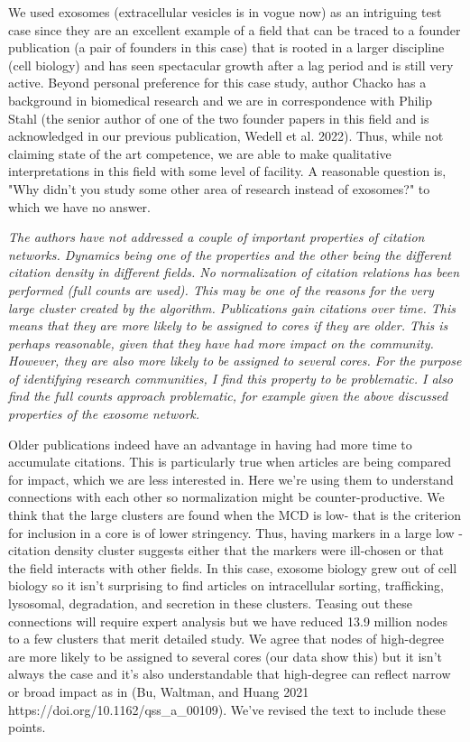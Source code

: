 \documentclass[11pt, oneside]{article}   	%
\begin{document}
We used exosomes (extracellular vesicles is in vogue now) as an intriguing  test case since they are an excellent example of a field that can be traced to a founder publication (a pair of founders in this case) that is rooted in a larger discipline (cell biology) and has seen spectacular growth after a lag period and is still very active. Beyond personal preference for this case study, author Chacko has a background in biomedical research and we are in correspondence with Philip Stahl (the senior author of one of the two founder papers in this field and is acknowledged in our previous publication, Wedell et al. 2022). Thus, while not claiming state of the art competence, we are able to make qualitative interpretations in this field with some level of facility.  A reasonable question is, "Why didn't you study some other area of research instead of exosomes?" to which we have no answer. 

\emph{The authors have not addressed a couple of important properties of citation networks. Dynamics being one of the properties and the other being the different citation density in different fields. No normalization of citation relations has been performed (full counts are used). This may be one of the reasons for the very large cluster created by the algorithm. Publications gain citations over time. This means that they are more likely to be assigned to cores if they are older. This is perhaps reasonable, given that they have had more impact on the community. However, they are also more likely to be assigned to several cores. For the purpose of identifying research communities, I find this property to be problematic. I also find the full counts approach problematic, for example given the above discussed properties of the exosome network.}

Older publications indeed have an advantage in having had more time to accumulate citations. This is particularly true when articles are being compared for impact, which we are less interested in. Here we're using them to understand connections with each other so normalization might be counter-productive. We think that the large clusters are found when the MCD is low- that is the criterion for inclusion in a core is of lower stringency. Thus, having markers in a large low -citation density cluster suggests either that the markers were ill-chosen or that the field interacts with other fields. In this case, exosome biology grew out of cell biology so it isn't surprising to find articles on intracellular sorting, trafficking, lysosomal, degradation, and secretion in these clusters. Teasing out these connections will require expert analysis but we have reduced 13.9 million nodes to a few clusters that merit detailed study. We agree that nodes of high-degree are more likely to be assigned to several cores (our data show this) but it isn't always the case and it's also understandable that high-degree can reflect narrow or broad impact as in (Bu, Waltman, and Huang 2021 https://doi.org/10.1162/qss\_a\_00109). We've revised the text to include these points. 
\end{document}
